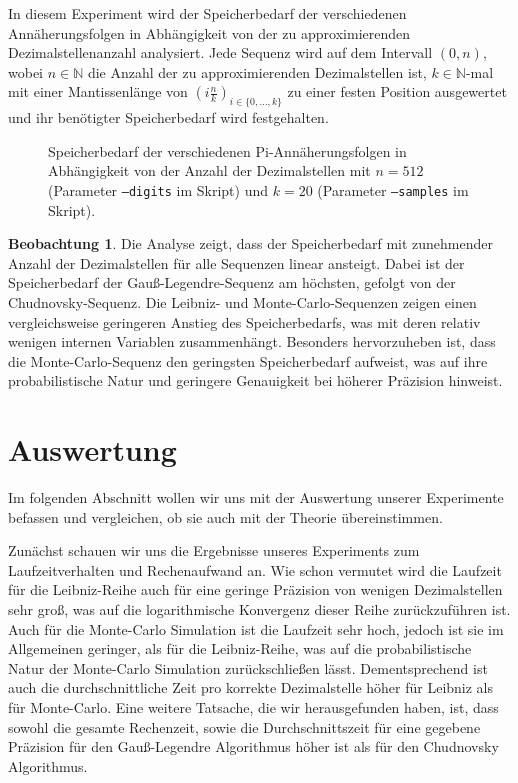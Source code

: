 \documentclass{scrartcl}
\theoremstyle{definition}
\newtheorem{approximation sequence}{Annäherungsfolge}
\newtheorem{observation}{Beobachtung}
\begin{document}
In diesem Experiment wird der Speicherbedarf der verschiedenen
Annäherungsfolgen in Abhängigkeit von der zu approximierenden
Dezimalstellenanzahl analysiert. Jede Sequenz wird auf dem Intervall \((0,
n)\), wobei \(n \in \mathbb{N}\) die Anzahl der zu approximierenden
Dezimalstellen ist, \(k \in \mathbb{N}\)-mal mit einer Mantissenlänge von
\(\left(i \frac{n}{k}\right)_{i \in \{0, \ldots, k\}}\) zu einer festen
Position ausgewertet und ihr benötigter Speicherbedarf wird festgehalten.

\begin{figure}[H]
    \centering
    
    \caption{
        Speicherbedarf der verschiedenen Pi-Annäherungsfolgen in Abhängigkeit
        von der Anzahl der Dezimalstellen mit \(n = 512\) (Parameter
        \texttt{--digits} im Skript) und \(k = 20\) (Parameter
        \texttt{--samples} im Skript).
    }
    \label{fig:memory-usage}
\end{figure}

\begin{observation}
    Die Analyse zeigt, dass der Speicherbedarf mit zunehmender Anzahl der
    Dezimalstellen für alle Sequenzen linear ansteigt. Dabei ist der
    Speicherbedarf der Gauß-Legendre-Sequenz am höchsten, gefolgt von der
    Chudnovsky-Sequenz. Die Leibniz- und Monte-Carlo-Sequenzen zeigen einen
    vergleichsweise geringeren Anstieg des Speicherbedarfs, was mit deren
    relativ wenigen internen Variablen zusammenhängt. Besonders hervorzuheben
    ist, dass die Monte-Carlo-Sequenz den geringsten Speicherbedarf aufweist,
    was auf ihre probabilistische Natur und geringere Genauigkeit bei höherer
    Präzision hinweist.
\end{observation}

\section{Auswertung}
Im folgenden Abschnitt wollen wir uns mit der Auswertung unserer Experimente
befassen und vergleichen, ob sie auch mit der Theorie übereinstimmen.

Zunächst schauen wir uns die Ergebnisse unseres Experiments zum
Laufzeitverhalten und Rechenaufwand an. Wie schon vermutet wird die Laufzeit
für die Leibniz-Reihe auch für eine geringe Präzision von wenigen
Dezimalstellen sehr groß, was auf die logarithmische Konvergenz dieser Reihe
zurückzuführen ist. Auch für die Monte-Carlo Simulation ist die Laufzeit sehr
hoch, jedoch ist sie im Allgemeinen geringer, als für die Leibniz-Reihe, was
auf die probabilistische Natur der Monte-Carlo Simulation zurückschließen
lässt. Dementsprechend ist auch die durchschnittliche Zeit pro korrekte
Dezimalstelle höher für Leibniz als für Monte-Carlo. Eine weitere Tatsache, die
wir herausgefunden haben, ist, dass sowohl die gesamte Rechenzeit, sowie die
Durchschnittszeit für eine gegebene Präzision für den Gauß-Legendre Algorithmus
höher ist als für den Chudnovsky Algorithmus.
\end{document}
